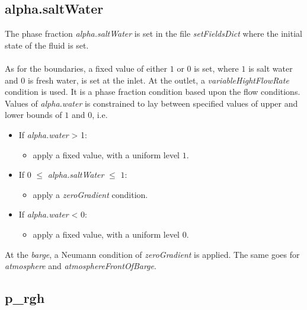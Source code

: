 \documentclass[a4paper, 12pt]{report}
\begin{document}
\subsection{alpha.saltWater}
The phase fraction \textit{alpha.saltWater} is set in the file \textit{setFieldsDict} where the initial state of the fluid is set.\\
\\
As for the boundaries, a fixed value of either $1$ or $0$ is set, where $1$ is salt water and $0$ is fresh water, is set at the inlet. At the outlet, a \textit{variableHightFlowRate} condition is used. It is a phase fraction condition based upon the flow conditions. Values of \textit{alpha.water} is constrained to lay between specified values of upper and lower bounds of $1$ and $0$, i.e.
\begin{itemize}
\item If \textit{alpha.water} > 1:
	\begin{itemize}
	\item apply a fixed value, with a uniform level $1$.
\end{itemize}
\item If $0$ $\leq$ \textit{alpha.saltWater} $\leq$ $1$:
	\begin{itemize}
	\item apply a \textit{zeroGradient} condition.
	\end{itemize}
\item If \textit{alpha.water} < 0:
	\begin{itemize}
	\item apply a fixed value, with a uniform level $0$.
\end{itemize}
\end{itemize}
At the \textit{barge}, a Neumann condition of \textit{zeroGradient} is applied. The same goes for \textit{atmosphere} and \textit{atmosphereFrontOfBarge}.
\subsection{p\_rgh}
\end{document}
